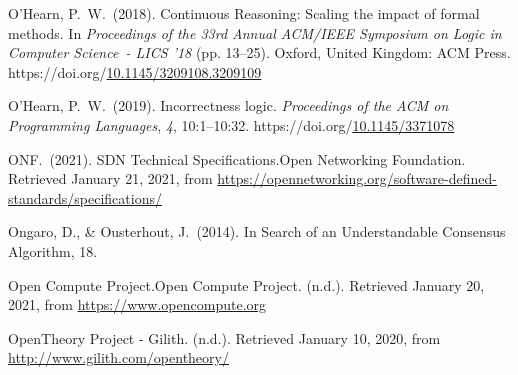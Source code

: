 \documentclass[12pt,twoside]{article}
\begin{document}
{\begin{thebibliography}{1079}
\mdbibitemlabel{}O’Hearn, P.~W.~(2018). Continuous Reasoning: Scaling the impact of formal methods. In \emph{Proceedings of the 33rd Annual ACM/IEEE Symposium on Logic in Computer Science~- LICS ’18} (pp. 13–25). Oxford, United Kingdom: ACM Press. https://doi.org/\href{https://dx.doi.org/10.1145/3209108.3209109}{10.1145/3209108.3209109}%

\mdbibitemlabel{}O’Hearn, P.~W.~(2019). Incorrectness logic. \emph{Proceedings of the ACM on Programming Languages}, \emph{4}, 10:1–10:32. https://doi.org/\href{https://dx.doi.org/10.1145/3371078}{10.1145/3371078}%

\mdbibitemlabel{}ONF.~(2021). SDN Technical Specifications.Open Networking Foundation. Retrieved January 21, 2021, from \href{https://opennetworking.org/software-defined-standards/specifications/}{{\ttfamily https://\hspace{0pt}opennetworking.\hspace{0pt}org/\hspace{0pt}software-\hspace{0pt}defined-\hspace{0pt}standards/\hspace{0pt}specifications/\hspace{0pt}}}%

\mdbibitemlabel{}Ongaro, D., \& Ousterhout, J.~(2014). In Search of an Understandable Consensus Algorithm, 18.%

\mdbibitemlabel{}Open Compute Project.Open Compute Project. (n.d.). Retrieved January 20, 2021, from \href{https://www.opencompute.org}{{\ttfamily https://\hspace{0pt}www.\hspace{0pt}opencompute.\hspace{0pt}org}}%

\mdbibitemlabel{}OpenTheory Project - Gilith. (n.d.). Retrieved January 10, 2020, from \href{http://www.gilith.com/opentheory/}{{\ttfamily http://\hspace{0pt}www.\hspace{0pt}gilith.\hspace{0pt}com/\hspace{0pt}opentheory/\hspace{0pt}}}%


\end{thebibliography}}
\end{document}
